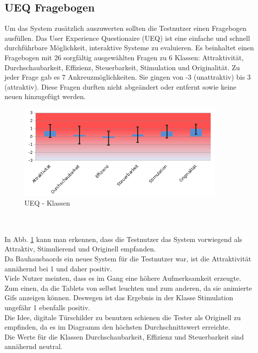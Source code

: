 \subsection{UEQ Fragebogen}\label{UEQ Fragebogen}
Um das System zusätzlich auszuwerten sollten die Testnutzer einen Fragebogen ausfüllen.
Das User Experience Questionaire (UEQ) ist eine einfache und schnell durchführbare Möglichkeit, interaktive Systeme zu evaluieren.
Es beinhaltet einen Fragebogen mit 26 sorgfältig ausgewählten Fragen zu 6 Klassen: Attraktivität, Durchschaubarkeit, Effizienz, Steuerbarkeit, Stimulation und Originalität.
Zu jeder Frage gab es 7 Ankreuzmöglichkeiten. Sie gingen von -3 (unattraktiv) bis 3 (attraktiv).
Diese Fragen durften nicht abgeändert oder entfernt sowie keine neuen hinzugefügt werden.
\begin{figure}[h!]
  \centering
    \includegraphics[width=0.9\textwidth]{./img/UEQ_Scales.png}
  \caption{UEQ - Klassen}
  \label{img:UEQScales}
\end{figure}
\\
\\
In Abb. \ref{img:UEQScales} kann man erkennen, dass die Testnutzer das System vorwiegend als Attraktiv, Stimulierend und Originell empfanden.
\\
Da Bauhausbaords ein neues System für die Testnutzer war, ist die Attraktivität annähernd bei 1 und daher positiv.
\\
Viele Nutzer meinten, dass es im Gang eine höhere Aufmerksamkeit erzeugte. Zum einen, da die Tablets von selbst leuchten und zum anderen, da sie animierte Gifs anzeigen können. Deswegen ist das Ergebnis in der Klasse Stimulation ungefähr 1 ebenfalls positiv.
\\
Die Idee, digitale Türschilder zu benutzen schienen die Tester als Originell zu empfinden, da es im Diagramm den höchsten Durchschnittswert erreichte.
\\
Die Werte für die Klassen Durchschaubarkeit, Effizienz und Steuerbarkeit sind annähernd neutral.

